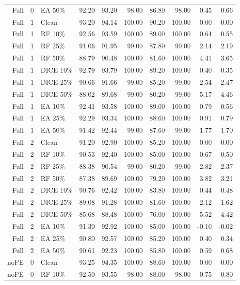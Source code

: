 {\begin{longtable}{rllrrrrrrr}
Full & 0 & EA 50\% & 92.20 & 93.20 & 98.00 & 86.80 & 98.00 & 0.45 & 0.66 \\
Full & 1 & Clean & 93.20 & 94.14 & 100.00 & 90.20 & 100.00 & 0.00 & 0.00 \\
Full & 1 & RF 10\% & 92.56 & 93.59 & 100.00 & 89.00 & 100.00 & 0.64 & 0.55 \\
Full & 1 & RF 25\% & 91.06 & 91.95 & 99.00 & 87.80 & 99.00 & 2.14 & 2.19 \\
Full & 1 & RF 50\% & 88.79 & 90.48 & 100.00 & 81.60 & 100.00 & 4.41 & 3.65 \\
Full & 1 & DICE 10\% & 92.79 & 93.79 & 100.00 & 89.20 & 100.00 & 0.40 & 0.35 \\
Full & 1 & DICE 25\% & 90.66 & 91.66 & 99.00 & 85.20 & 99.00 & 2.54 & 2.47 \\
Full & 1 & DICE 50\% & 88.02 & 89.68 & 99.00 & 80.20 & 99.00 & 5.17 & 4.46 \\
Full & 1 & EA 10\% & 92.41 & 93.58 & 100.00 & 89.00 & 100.00 & 0.79 & 0.56 \\
Full & 1 & EA 25\% & 92.29 & 93.34 & 100.00 & 88.60 & 100.00 & 0.91 & 0.79 \\
Full & 1 & EA 50\% & 91.42 & 92.44 & 99.00 & 87.60 & 99.00 & 1.77 & 1.70 \\
Full & 2 & Clean & 91.20 & 92.90 & 100.00 & 85.20 & 100.00 & 0.00 & 0.00 \\
Full & 2 & RF 10\% & 90.53 & 92.40 & 100.00 & 85.00 & 100.00 & 0.67 & 0.50 \\
Full & 2 & RF 25\% & 88.38 & 90.54 & 99.00 & 80.20 & 99.00 & 2.82 & 2.37 \\
Full & 2 & RF 50\% & 87.38 & 89.69 & 100.00 & 79.20 & 100.00 & 3.82 & 3.21 \\
Full & 2 & DICE 10\% & 90.76 & 92.42 & 100.00 & 83.80 & 100.00 & 0.44 & 0.48 \\
Full & 2 & DICE 25\% & 89.08 & 91.28 & 100.00 & 81.60 & 100.00 & 2.12 & 1.62 \\
Full & 2 & DICE 50\% & 85.68 & 88.48 & 100.00 & 76.00 & 100.00 & 5.52 & 4.42 \\
Full & 2 & EA 10\% & 91.30 & 92.92 & 100.00 & 85.00 & 100.00 & -0.10 & -0.02 \\
Full & 2 & EA 25\% & 90.80 & 92.57 & 100.00 & 85.20 & 100.00 & 0.40 & 0.34 \\
Full & 2 & EA 50\% & 90.61 & 92.23 & 100.00 & 85.80 & 100.00 & 0.59 & 0.68 \\
noPE & 0 & Clean & 93.25 & 94.35 & 100.00 & 88.60 & 100.00 & 0.00 & 0.00 \\
noPE & 0 & RF 10\% & 92.50 & 93.55 & 98.00 & 88.00 & 98.00 & 0.75 & 0.80 \\

\end{longtable}}
